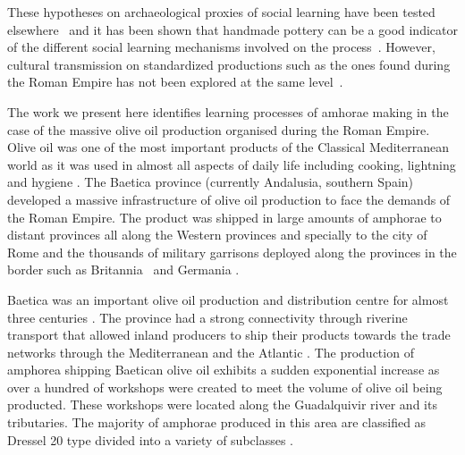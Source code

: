 \documentclass[review]{elsarticle}
\begin{document}
These hypotheses on archaeological proxies of social learning have been tested elsewhere~\citep{roux_standardization_2015} and it has been shown that handmade pottery can be a good indicator of the different social learning mechanisms involved on the process~\citep{steele_james_ceramic_2010,neiman_stylistic_1995, shennan_ceramic_2001}. However, cultural transmission on standardized productions such as the ones found during the Roman Empire has not been explored at the same level~\citep{bevan_mediterranean_2014}.

The work we present here identifies learning processes of amhorae making in the case of the massive olive oil production organised during the Roman Empire. Olive oil was one of the most important products of the Classical Mediterranean world as it was used in almost all aspects of daily life including cooking, lightning and hygiene \citep{mattingly_d.j._oil_1988}. The Baetica province (currently Andalusia, southern Spain) developed a massive infrastructure of olive oil production to face the demands of the Roman Empire. The product was shipped in large amounts of amphorae to distant provinces all along the Western provinces and specially to the city of Rome and the thousands of military garrisons deployed along the provinces in the border such as Britannia~\citep{monfort_britannia_1998,funari_economic_2005} and Germania \citep{remesal_annona_1986}. 

Baetica was an important olive oil production and distribution centre for almost three centuries \citep{millet_anforas_1998, rodriguez_baetican_1998,chic2005comercio,rodriguez_economioleicola_1977}. The province had a strong connectivity through riverine transport that allowed inland producers to ship their products towards the trade networks through the Mediterranean and the Atlantic \citep{garcia_vargas_enrique_formal_2010}. The production of amphorea shipping Baetican olive oil exhibits a sudden exponential increase as over a hundred of workshops were created to meet the volume of olive oil being producted. These workshops were located along the Guadalquivir river and its tributaries. The majority of amphorae produced in this area are classified as Dressel 20 type divided into a variety of subclasses \citep{martin-kilcher_romischen_1994,berni_millet_epigrafianforica_2008}.
\end{document}
